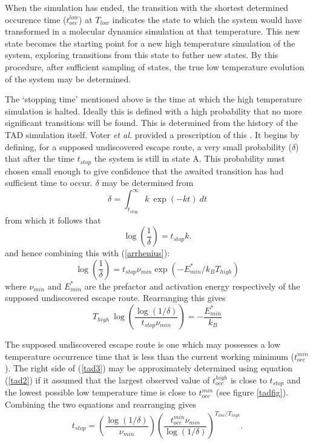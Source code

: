 When the simulation has ended, the transition with the shortest
determined occurence time ($t_{occ}^{low}$) at $T_{low}$ indicates the
state to which the system would have transformed in a molecular dynamics
simulation at that temperature. This new state becomes the starting
point for a new high temperature simulation of the system, exploring
transitions from this state to futher new states. 
By this procedure, after sufficient sampling of states, the true low
temperature evolution of the system may be determined.

The `stopping time' mentioned above is the time at which the high
temperature simulation is halted. Ideally this is defined with a high
probability that no more significant transitions will be found.  This
is determined from the history of the TAD simulation itself. Voter
{\em et al.} provided a prescription of this \cite{voter-00a}. It
begins by defining, for a supposed undiscovered escape route, a very
small probability ($\delta$) that after the time $t_{stop}$ the system
is still in state A. This probability must chosen small enough to give
confidence that the awaited transition has had sufficient time to
occur. $\delta$ may be determined from
\begin{equation}
\delta=\int_{t_{stop}}^{\infty} k~\exp(-kt)~dt
\end{equation}
from which it follows that
\begin{equation}
\log\left (\frac{1}{\delta}\right )=t_{stop}k.
\end{equation}
and hence combining this with (\ref{arrhenius}):
\begin{equation}
\log\left (\frac{1}{\delta}\right
)=t_{stop}\nu_{min}\exp(-E^{*}_{min}/k_BT_{high})
\end{equation}
where $\nu_{min}$ and $E_{min}^{*}$ are the prefactor and activation
energy respectively of the supposed undiscovered escape
route. Rearranging this gives
\begin{equation}
T_{high}~\log\left (\frac{\log(1/\delta)}{t_{stop}\nu_{min}}\right )=
-\frac{E^{*}_{min}}{k_B} \label{tad3}
\end{equation}

The supposed undiscovered escape route is one which may possesses a
low temperature occurrence time that is less than the current working
minimum ($t_{occ}^{min}$). The right side of (\ref{tad3}) may be
approximately determined using equation (\ref{tad2}) if it assumed
that the largest observed value of $t_{occ}^{high}$ is close to
$t_{stop}$ and the lowest possible low temperature time is close to
$t_{occ}^{min}$ (see figure \ref{tadfig}). Combining the two equations
and rearranging gives
\begin{equation}
t_{stop}=\left (\frac{\log(1/\delta)}{\nu_{min}}\right )
\left (\frac{t_{occ}^{min}\nu_{min}}{\log(1/\delta)}\right )^{T_{low}/T_{high}}.
\end{equation}

